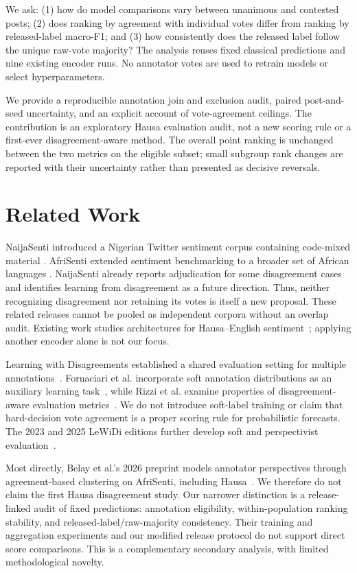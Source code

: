 \documentclass[conference]{IEEEtran}
\begin{document}
We ask: (1) how do model comparisons vary between unanimous and contested
posts; (2) does ranking by agreement with individual votes differ from ranking
by released-label macro-F1; and (3) how consistently does the released label
follow the unique raw-vote majority? The analysis reuses fixed classical
predictions and nine existing encoder runs. No annotator votes are used to
retrain models or select hyperparameters.

We provide a reproducible annotation join and exclusion audit, paired
post-and-seed uncertainty, and an explicit account of vote-agreement ceilings.
The contribution is an exploratory Hausa evaluation audit, not a new scoring
rule or a first-ever disagreement-aware method. The overall point ranking is
unchanged between the two metrics on the eligible subset; small subgroup rank changes are reported with
their uncertainty rather than presented as decisive reversals.

\section{Related Work}
NaijaSenti introduced a Nigerian Twitter sentiment corpus containing
code-mixed material \cite{naijasenti}. AfriSenti extended sentiment
benchmarking to a broader set of African languages \cite{afrisenti}.
NaijaSenti already reports adjudication for some disagreement cases and
identifies learning from disagreement as a future direction. Thus, neither
recognizing disagreement nor retaining its votes is itself a new proposal.
These related releases cannot be pooled as independent corpora without an
overlap audit. Existing work studies architectures for Hausa--English
sentiment~\cite{hausa2025}; applying another encoder alone is not our focus.

Learning with Disagreements established a shared evaluation setting for
multiple annotations~\cite{le-wi-di}. Fornaciari et al. incorporate soft
annotation distributions as an auxiliary learning task~\cite{softlearning},
while Rizzi et al. examine properties of disagreement-aware evaluation
metrics~\cite{softmetrics}. We do not introduce soft-label training or claim
that hard-decision vote agreement is a proper scoring rule for probabilistic
forecasts. The 2023 and 2025 LeWiDi editions further develop soft and
perspectivist evaluation~\cite{le-wi-di-2023,le-wi-di-2025}.

Most directly, Belay et al.'s 2026 preprint models annotator perspectives
through agreement-based clustering on AfriSenti, including
Hausa~\cite{clustering2026}. We therefore do not claim the first Hausa
disagreement study. Our narrower distinction is a release-linked audit of
fixed predictions: annotation eligibility, within-population ranking stability,
and released-label/raw-majority consistency. Their training and aggregation
experiments and our modified release protocol do not support direct score
comparisons. This is a complementary secondary analysis, with limited
methodological novelty.
\end{document}

